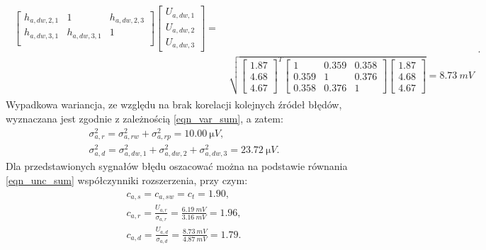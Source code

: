 \begin{gather}
\begin{split}
{\begin{bmatrix}
h_{a,dw,2,1} & 1            & h_{a,dw,2,3} \\
h_{a,dw,3,1} & h_{a,dw,3,1} & 1                 \\
\end{bmatrix}
\begin{bmatrix}
U_{a,dw,1} \\ U_{a,dw,2} \\ U_{a,dw,3}
\end{bmatrix}} = ~ \\
& \sqrt{
\begin{bmatrix}
1.87 \\ 4.68 \\ 4.67
\end{bmatrix}^{T}
\begin{bmatrix}
1     & 0.359 & 0.358 \\
0.359 & 1     & 0.376 \\
0.358 & 0.376 & 1
\end{bmatrix}
\begin{bmatrix}
1.87 \\ 4.68 \\ 4.67
\end{bmatrix}} = \qty{8.73}{mV}
\end{split}
\label{eqn_sym_parta_uncert_dyn}.
\end{gather}
Wypadkowa wariancja, ze względu na brak korelacji kolejnych źródeł błędów, wyznaczana jest zgodnie z zależnością \eqref{eqn_var_sum}, a zatem:
\begin{gather}
\sigma_{a,r}^{2} = \sigma_{a,rw}^{2} + \sigma_{a,rp}^{2} = \qty{10.00}{\micro V} \label{eqn_sym_parta_var_rand}, \\
\sigma_{a,d}^{2} = \sigma_{a,dw,1}^{2} + \sigma_{a,dw,2}^{2} + \sigma_{a,dw,3}^{2} = \qty{23.72}{\micro V} \label{eqn_sym_parta_var_dyn}.
\end{gather}
Dla przedstawionych sygnałów błędu oszacować można na podstawie równania \eqref{eqn_unc_sum} współczynniki rozszerzenia, przy czym:
\begin{gather}
c_{a,s} = c_{a,sw} = c_{t} = 1.90 \label{eqn_sym_parta_factor_sta}, \\
c_{a,r} = \frac{U_{a,r}}{\sigma_{a,r}} = \frac{\qty{6.19}{mV}}{\qty{3.16}{mV}} = 1.96 \label{eqn_sym_parta_factor_rand}, \\
c_{a,d} = \frac{U_{a,d}}{\sigma_{a,d}} = \frac{\qty{8.73}{mV}}{\qty{4.87}{mV}} = 1.79 \label{eqn_sym_parta_factor_dyn}.
\end{gather}

